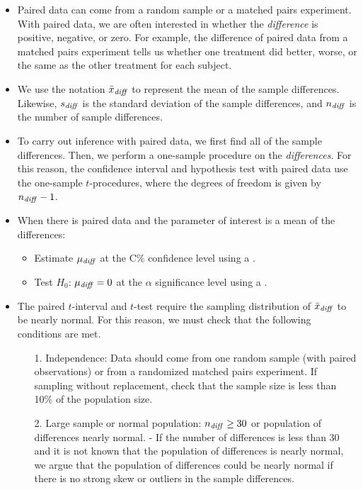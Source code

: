 \begin{itemize} 
\item Paired data can come from a {random sample} or a {matched pairs experiment}.   With paired data, we are often interested in whether the \emph{difference} is positive, negative, or zero.  For example, the difference of paired data from a matched pairs experiment tells us whether one treatment did better, worse, or the same as the other treatment for each subject.

\item We use the notation $\bar{x}_{\text{\emph{diff}}}$ to represent the mean of the sample differences.  Likewise, $s_{\text{\emph{diff}}}$ is the standard deviation of the sample differences, and $n_{\text{\emph{diff}}}$ is the number of sample differences.


\item To carry out inference with paired data, we first find all of the sample differences.  Then, we perform a one-sample procedure on the \emph{differences}.  For this reason, the confidence interval and hypothesis test with paired data use the one-sample $t$-procedures, where the degrees of freedom is given by $n_{\text{\emph{diff}}}-1$.


\item When there is paired data and the parameter of interest is a mean of the differences:  
\begin{itemize}
\item Estimate $\mu_{\text{\emph{diff}}}$ at the C\% confidence level using a .
\item Test $H_0$: $\mu_{\text{\emph{diff}}}=0$ at the $\alpha$ significance level using a . 
\end{itemize}

\item The paired $t$-interval and $t$-test require the sampling distribution of $\bar{x}_{\text{\emph{diff}}}$ to be nearly normal.  For this reason, we must check that the following conditions are met.
\begin{itemize}
\item[1.]  Independence:  Data should come from one random sample (with paired observations) or from a randomized matched pairs experiment.  If sampling without replacement, check that the sample size is less than 10\% of the population size.
\item[2.]  Large sample or normal population:  $n_{\text{\emph{diff}}}\ge 30$ or  population of differences nearly normal.
- If the number of differences is less than 30 and it is not known that the population of differences is nearly normal, we argue that the population of differences could be nearly normal if there is no strong skew or outliers in the sample differences.
\end{itemize}



\end{itemize}
